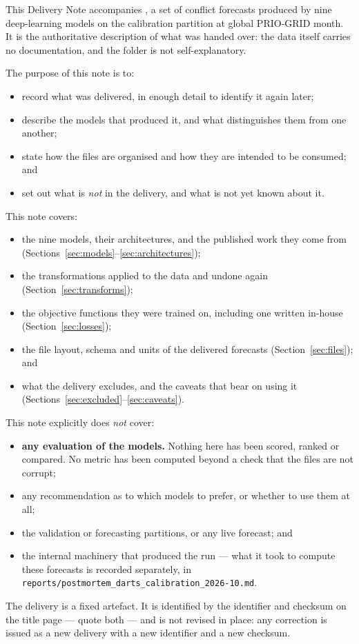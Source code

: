This Delivery Note accompanies \texttt{\deliveryid}, a set of conflict forecasts produced by nine
deep-learning models on the calibration partition at global PRIO-GRID month. It is the
authoritative description of what was handed over: the data itself carries no documentation, and
the folder is not self-explanatory.

The purpose of this note is to:
\begin{itemize}
    \item record what was delivered, in enough detail to identify it again later;
    \item describe the models that produced it, and what distinguishes them from one another;
    \item state how the files are organised and how they are intended to be consumed; and
    \item set out what is \emph{not} in the delivery, and what is not yet known about it.
\end{itemize}

\noindent This note covers:
\begin{itemize}
    \item the nine models, their architectures, and the published work they come from
          (Sections~\ref{sec:models}--\ref{sec:architectures});
    \item the transformations applied to the data and undone again
          (Section~\ref{sec:transforms});
    \item the objective functions they were trained on, including one written in-house
          (Section~\ref{sec:losses});
    \item the file layout, schema and units of the delivered forecasts
          (Section~\ref{sec:files}); and
    \item what the delivery excludes, and the caveats that bear on using it
          (Sections~\ref{sec:excluded}--\ref{sec:caveats}).
\end{itemize}

\noindent This note explicitly does \emph{not} cover:
\begin{itemize}
    \item \textbf{any evaluation of the models.} Nothing here has been scored, ranked or compared.
          No metric has been computed beyond a check that the files are not corrupt;
    \item any recommendation as to which models to prefer, or whether to use them at all;
    \item the validation or forecasting partitions, or any live forecast; and
    \item the internal machinery that produced the run --- what it took to compute these
          forecasts is recorded separately, in
          \texttt{reports/postmortem\_darts\_calibration\_2026-10.md}.
\end{itemize}

\noindent The delivery is a fixed artefact. It is identified by the identifier and checksum on
the title page --- quote both --- and is not revised in place: any correction is issued as a new
delivery with a new identifier and a new checksum.
